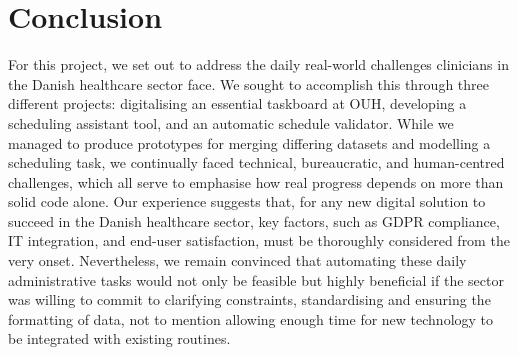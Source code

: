 \section{Conclusion}
For this project, we set out to address the daily real-world challenges clinicians in the Danish healthcare sector face. We sought to accomplish this through three different projects: digitalising an essential taskboard at OUH, developing a scheduling assistant tool, and an automatic schedule validator. While we managed to produce prototypes for merging differing datasets and modelling a scheduling task, we continually faced technical, bureaucratic, and human-centred challenges, which all serve to emphasise how real progress depends on more than solid code alone. Our experience suggests that, for any new digital solution to succeed in the Danish healthcare sector, key factors, such as GDPR compliance, IT integration, and end-user satisfaction, must be thoroughly considered from the very onset. Nevertheless, we remain convinced that automating these daily administrative tasks would not only be feasible but highly beneficial if the sector was willing to commit to clarifying constraints, standardising and ensuring the formatting of data, not to mention allowing enough time for new technology to be integrated with existing routines.